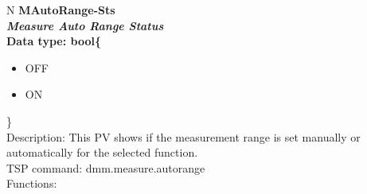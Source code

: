 \documentclass[openany]{article}
\begin{document}
		\begin{tabular}{N}
			\hline
			\bfseries MAutoRange-Sts\label{pv:mautorange-sts} \\ \hline
			\emph{Measure Auto Range Status} \\
			Data type: bool\{\begin{itemize}[noitemsep]
				\small
				\item[] OFF
				\item[] ON
			\end{itemize}\} \\
			Description: This PV shows if the measurement range is set manually or automatically for the selected function.\\
			TSP command: dmm.measure.autorange \\
			Functions: \\
			\arrayrulecolor{\FuncTableBorderColor}

		\end{tabular}
\end{document}

